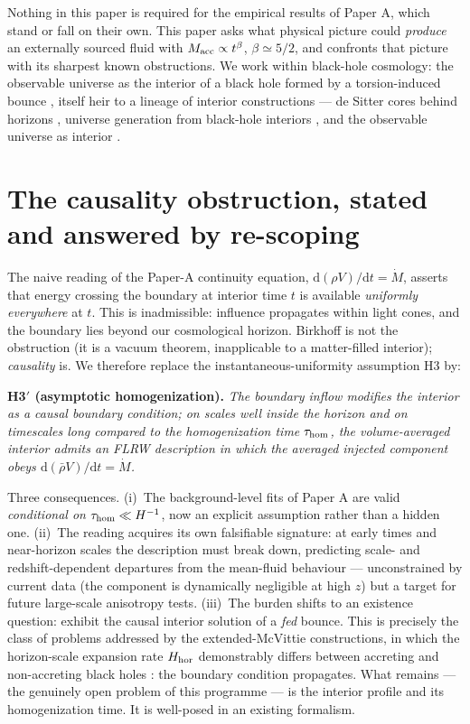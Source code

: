 \documentclass[11pt]{article}
\begin{document}
Nothing in this paper is required for the empirical results of Paper A, which stand or fall on their own. This paper asks what physical picture could \emph{produce} an externally sourced fluid with $M_{\rm acc} \propto t^{\beta}$, $\beta \simeq 5/2$, and confronts that picture with its sharpest known obstructions. We work within black-hole cosmology: the observable universe as the interior of a black hole formed by a torsion-induced bounce \cite{Pop2010,Pop2016}, itself heir to a lineage of interior constructions --- de Sitter cores behind horizons \cite{FMM1989,Dymnikova1992}, universe generation from black-hole interiors \cite{EB2001}, and the observable universe as interior \cite{Pathria1972,Stuckey1994}.

\section{The causality obstruction, stated and answered by re-scoping}
\label{sec:caus}
The naive reading of the Paper-A continuity equation, $\mathrm{d}(\rho V)/\mathrm{d}t = \dot M$, asserts that energy crossing the boundary at interior time $t$ is available \emph{uniformly everywhere} at $t$. This is inadmissible: influence propagates within light cones, and the boundary lies beyond our cosmological horizon. Birkhoff is not the obstruction (it is a vacuum theorem, inapplicable to a matter-filled interior); \emph{causality} is. We therefore replace the instantaneous-uniformity assumption H3 by:

\medskip
\noindent\textbf{H3$'$ (asymptotic homogenization).} \emph{The boundary inflow modifies the interior as a causal boundary condition; on scales well inside the horizon and on timescales long compared to the homogenization time $\tau_{\rm hom}$, the volume-averaged interior admits an FLRW description in which the averaged injected component obeys $\mathrm{d}(\bar\rho V)/\mathrm{d}t = \dot M$.}
\medskip

Three consequences. (i)~The background-level fits of Paper A are valid \emph{conditional on} $\tau_{\rm hom} \ll H^{-1}$, now an explicit assumption rather than a hidden one. (ii)~The reading acquires its own falsifiable signature: at early times and near-horizon scales the description must break down, predicting scale- and redshift-dependent departures from the mean-fluid behaviour --- unconstrained by current data (the component is dynamically negligible at high $z$) but a target for future large-scale anisotropy tests. (iii)~The burden shifts to an existence question: exhibit the causal interior solution of a \emph{fed} bounce. This is precisely the class of problems addressed by the extended-McVittie constructions, in which the horizon-scale expansion rate $H_{\rm hor}$ demonstrably differs between accreting and non-accreting black holes \cite{Pop2024}: the boundary condition propagates. What remains --- the genuinely open problem of this programme --- is the interior profile and its homogenization time. It is well-posed in an existing formalism.
\end{document}
